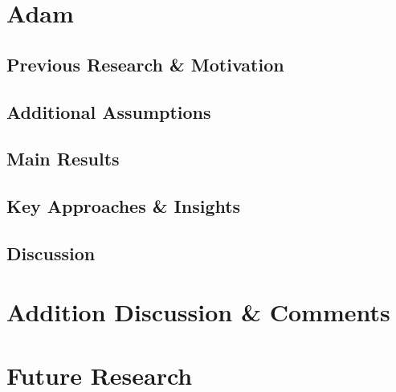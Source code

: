 \documentclass{article}
\begin{document}
\section{Adam}
\label{section7}
\subsection{Previous Research \& Motivation}
\subsection{Additional Assumptions}
\subsection{Main Results}
\subsection{Key Approaches \& Insights}
\subsection{Discussion}
\section{Addition Discussion \& Comments}
\section{Future Research}
\pagebreak


%
\end{document}
